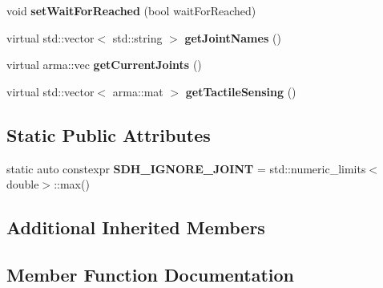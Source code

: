 \begin{DoxyCompactItemize}
\item 
void {\bfseries set\+Wait\+For\+Reached} (bool wait\+For\+Reached)\hypertarget{classkukadu_1_1KukieHand_ae1b5de05777e8364b59a8832057c1e4f}{}\label{classkukadu_1_1KukieHand_ae1b5de05777e8364b59a8832057c1e4f}

\item 
virtual std\+::vector$<$ std\+::string $>$ {\bfseries get\+Joint\+Names} ()\hypertarget{classkukadu_1_1KukieHand_aa974a0837ed5efb96e0586604d55289e}{}\label{classkukadu_1_1KukieHand_aa974a0837ed5efb96e0586604d55289e}

\item 
virtual arma\+::vec {\bfseries get\+Current\+Joints} ()\hypertarget{classkukadu_1_1KukieHand_a80b72409f58b8d2b3529633b8381a030}{}\label{classkukadu_1_1KukieHand_a80b72409f58b8d2b3529633b8381a030}

\item 
virtual std\+::vector$<$ arma\+::mat $>$ {\bfseries get\+Tactile\+Sensing} ()\hypertarget{classkukadu_1_1KukieHand_aace79d111dc83774ed326756466429f6}{}\label{classkukadu_1_1KukieHand_aace79d111dc83774ed326756466429f6}

\end{DoxyCompactItemize}
\subsection*{Static Public Attributes}
\begin{DoxyCompactItemize}
\item 
static auto constexpr {\bfseries S\+D\+H\+\_\+\+I\+G\+N\+O\+R\+E\+\_\+\+J\+O\+I\+NT} = std\+::numeric\+\_\+limits$<$double$>$\+::max()\hypertarget{classkukadu_1_1KukieHand_a2fd16294d41f30d129b7c6c6251a3a98}{}\label{classkukadu_1_1KukieHand_a2fd16294d41f30d129b7c6c6251a3a98}

\end{DoxyCompactItemize}
\subsection*{Additional Inherited Members}


\subsection{Member Function Documentation}
